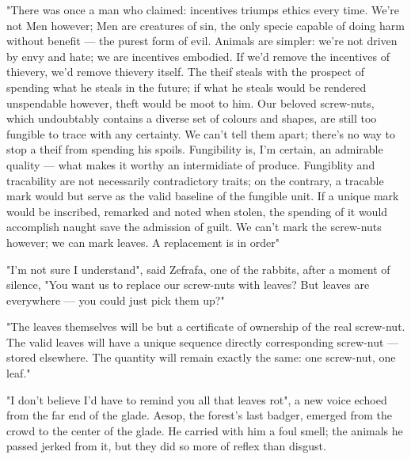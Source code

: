 
"There was once a man who claimed: incentives triumps ethics every time. We're not Men however; Men are creatures of sin, the only specie capable of doing harm without benefit — the purest form of evil. Animals are simpler: we're not driven by envy and hate; we are incentives embodied.
If we'd remove the incentives of thievery, we'd remove thievery itself. The theif steals with the prospect of spending what he steals in the future; if what he steals would be rendered unspendable however, theft would be moot to him.
Our beloved screw-nuts, which undoubtably contains a diverse set of colours and shapes, are still too fungible to trace with any certainty. We can't tell them apart; there's no way to stop a theif from spending his spoils. Fungibility is, I'm certain, an admirable quality — what makes it worthy an intermidiate of produce. Fungiblity and tracability are not necessarily contradictory traits; on the contrary, a tracable mark would but serve as the valid baseline of the fungible unit.
If a unique mark would be inscribed, remarked and noted when stolen, the spending of it would accomplish naught save the admission of guilt.
We can't mark the screw-nuts however; we can mark leaves. A replacement is in order"

"I'm not sure I understand", said Zefrafa, one of the rabbits, after a moment of silence, "You want us to replace our screw-nuts with leaves? But leaves are everywhere — you could just pick them up?"

"The leaves themselves will be but a certificate of ownership of the real screw-nut. The valid leaves will have a unique sequence directly corresponding screw-nut — stored elsewhere. The quantity will remain exactly the same: one screw-nut, one leaf." %

"I don't believe I'd have to remind you all that leaves rot", a new voice echoed from the far end of the glade. Aesop, the forest's last badger, emerged from the crowd to the center of the glade. He carried with him a foul smell; the animals he passed jerked from it, but they did so more of reflex than disgust. 

